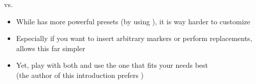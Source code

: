 \begin{frame}{\Minted vs. \Listings}
   \begin{itemize}
      \itemsep8pt
      \item While \Minted has more powerful presets (by using ), it is way harder to customize
      \item Especially if you want to insert arbitrary markers or perform replacements, \Listings allows this far simpler
      \item Yet, play with both and use the one that fits your needs best\\
         (the author of this introduction prefers \Listings)
   \end{itemize}
\end{frame}